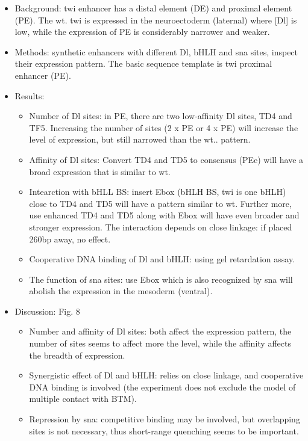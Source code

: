 \documentclass{report}
\begin{document}
\begin{enumerate}
\begin{itemize}
		\item Background: twi enhancer has a distal element (DE) and proximal element (PE). The wt. twi is expressed in the neuroectoderm (laternal) where [Dl] is low, while the expression of PE is considerably narrower and weaker. 
		
		\item Methods: synthetic enhancers with different Dl, bHLH and sna sites, inspect their expression pattern. The basic sequence template is twi proximal enhancer (PE). 
		
		\item Results: 
		\begin{itemize}
			\item Number of Dl sites: in PE, there are two low-affinity Dl sites, TD4 and TF5. Increasing the number of sites (2 x PE or 4 x PE) will increase the level of expression, but still narrowed than the wt.. pattern. 
			\item Affinity of Dl sites: Convert TD4 and TD5 to consensus (PEe) will have a broad expression that is similar to wt. 
			\item Intearction with bHLL BS: insert Ebox (bHLH BS, twi is one bHLH) close to TD4 and TD5 will have a pattern similar to wt. Further more, use enhanced TD4 and TD5 along with Ebox will have even broader and stronger expression. The interaction depends on close linkage: if placed 260bp away, no effect. 
			\item Cooperative DNA binding of Dl and bHLH: using gel retardation assay. 
			\item The function of sna sites: use Ebox which is also recognized by sna will abolish the expression in the mesoderm (ventral). 
		\end{itemize}
		
		\item Discussion: Fig. 8
		\begin{itemize}
			\item Number and affinity of Dl sites: both affect the expression pattern, the number of sites seems to affect more the level, while the affinity affects the breadth of expression. 
			\item Synergistic effect of Dl and bHLH: relies on close linkage, and cooperative DNA binding is involved (the experiment does not exclude the model of multiple contact with BTM). 
			\item Repression by sna: competitive binding may be involved, but overlapping sites is not necessary, thus short-range quenching seems to be important. 
		\end{itemize}
	\end{itemize}
	

\end{enumerate}
\end{document}
